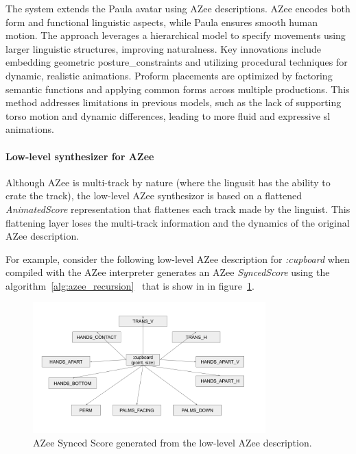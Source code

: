 \documentclass[../../main.tex]{subfiles}
\begin{document}
The system extends the Paula avatar using AZee descriptions. AZee encodes both form and functional linguistic aspects, while Paula ensures smooth human motion. The approach leverages a hierarchical model to specify movements using larger linguistic structures, improving naturalness. Key innovations include embedding geometric \gls{posture_constraint}s and utilizing procedural techniques for dynamic, realistic animations. Proform placements are optimized by factoring semantic functions and applying common forms across multiple productions. This method addresses limitations in previous models, such as the lack of supporting torso motion and dynamic differences, leading to more fluid and expressive \gls{sl} animations.

\paragraph{Low-level synthesizer for AZee}
\label{ch:background_work:sign_language_synthesis:3d_techniques:sign_language_synthesis_systems:azee_based:low_level_synthesizer_for_azee}

Although AZee is multi-track by nature (where the lingusit has the ability to crate the track), the low-level AZee synthesizor is based on a flattened \emph{AnimatedScore} representation that flattenes each track made by the linguist. This flattening layer loses the multi-track information and the dynamics of the original AZee description. 

For example, consider the following low-level AZee description for \emph{:cupboard} when compiled with the AZee interpreter generates an AZee \emph{SyncedScore} using the algorithm~\ref{alg:azee_recursion}~\cite{filhol2017synthesizing} that is show in in figure~\ref{fig:azee_synced_score}.

\begin{figure}[h]
    \centering
    \includegraphics[width=0.8\textwidth]{chapters/multi_track/images/azee_synced_score.png}
    \caption{AZee Synced Score generated from the low-level AZee description.}
    \label{fig:azee_synced_score}
\end{figure}
\end{document}
